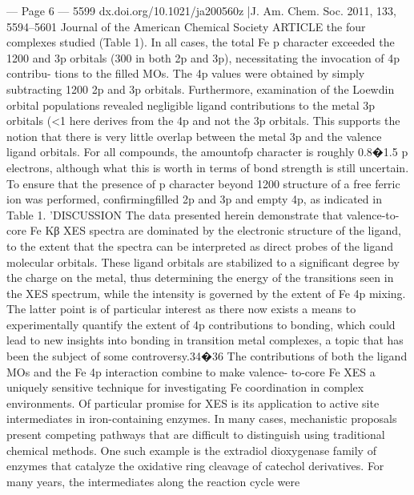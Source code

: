 --- Page 6 ---
5599
dx.doi.org/10.1021/ja200560z |J. Am. Chem. Soc. 2011, 133, 5594–5601
Journal of the American Chemical Society
ARTICLE
the four complexes studied (Table 1). In all cases, the total Fe p
character exceeded the 1200%
and 3p orbitals (300%
in both 2p and 3p), necessitating the invocation of 4p contribu-
tions to the ﬁlled MOs. The 4p values were obtained by simply
subtracting 1200%
2p and 3p orbitals. Furthermore, examination of the Loewdin
orbital populations revealed negligible ligand contributions to
the metal 3p orbitals (<1%
here derives from the 4p and not the 3p orbitals. This supports
the notion that there is very little overlap between the metal 3p
and the valence ligand orbitals.
For all compounds, the amountofp character is roughly 0.8�1.5
p electrons, although what this is worth in terms of bond strength is
still uncertain. To ensure that the presence of p character beyond
1200%
structure of a free ferric ion was performed, conﬁrmingﬁlled 2p and
3p and empty 4p, as indicated in Table 1.
’DISCUSSION
The data presented herein demonstrate that valence-to-core
Fe Kβ XES spectra are dominated by the electronic structure of
the ligand, to the extent that the spectra can be interpreted as
direct probes of the ligand molecular orbitals. These ligand
orbitals are stabilized to a signiﬁcant degree by the charge on
the metal, thus determining the energy of the transitions seen in
the XES spectrum, while the intensity is governed by the extent of
Fe 4p mixing. The latter point is of particular interest as there
now exists a means to experimentally quantify the extent of 4p
contributions to bonding, which could lead to new insights into
bonding in transition metal complexes, a topic that has been the
subject of some controversy.34�36 The contributions of both the
ligand MOs and the Fe 4p interaction combine to make valence-
to-core Fe XES a uniquely sensitive technique for investigating
Fe coordination in complex environments.
Of particular promise for XES is its application to active site
intermediates in iron-containing enzymes. In many cases,
mechanistic proposals present competing pathways that are
diﬃcult to distinguish using traditional chemical methods. One
such example is the extradiol dioxygenase family of enzymes
that catalyze the oxidative ring cleavage of catechol derivatives.
For many years, the intermediates along the reaction cycle were
